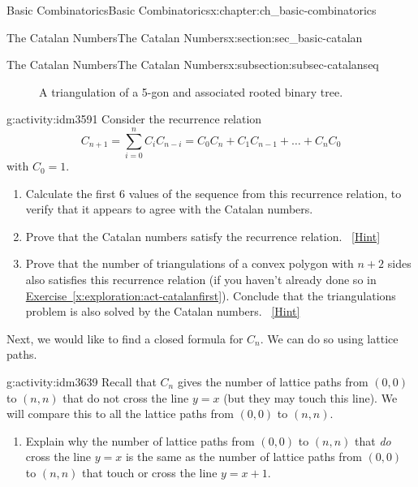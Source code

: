 \documentclass[oneside,10pt,]{book}
\numberwithin{equation}{chapter}
\newcommand{\vtx}[2]{node[fill,circle,inner sep=0pt, minimum size=4pt,label=#1:#2]{}}
\newcommand{\va}[1]{\vtx{above}{#1}}
\renewcommand{\v}{\vtx{above}{}}
\begin{document}
\begin{chapterptx}{Basic Combinatorics}{}{Basic Combinatorics}{}{}{x:chapter:ch_basic-combinatorics}
\begin{sectionptx}{The Catalan Numbers}{}{The Catalan Numbers}{}{}{x:section:sec_basic-catalan}
\begin{subsectionptx}{The Catalan Numbers}{}{The Catalan Numbers}{}{}{x:subsection:subsec-catalanseq}
\begin{figure}
\begin{sidebyside}{2}{0.125}{0.125}{0.25}
\begin{sbspanel}{0.25}
        \end{sbspanel}%
\end{sidebyside}%
\caption{A triangulation of a 5-gon and associated rooted binary tree.\label{x:figure:fig-triangulationtree}}
\end{figure}
\begin{activity}{}{g:activity:idm3591}%
Consider the recurrence relation%
\begin{equation*}
C_{n + 1} = \sum_{i = 0}^n C_iC_{n-i} = C_{0}C_{n} + C_{1}C_{n - 1} + \ldots + C_{n}C_{0}
\end{equation*}
with \(C_0 = 1\).%
\begin{enumerate}[font=\bfseries,label=(\alph*),ref=\alph*]
\item{}Calculate the first 6 values of the sequence from this recurrence relation, to verify that it appears to agree with the Catalan numbers.%
\item{}Prove that the Catalan numbers satisfy the recurrence relation.%
\qquad~\hfill{\tiny\hyperlink{g:hint:idm3604-back}{[Hint]}}\item{}Prove that the number of triangulations of a convex polygon with \(n+2\) sides also satisfies this recurrence relation (if you haven't already done so in \hyperref[x:exploration:act-catalanfirst]{Exercise~\ref{x:exploration:act-catalanfirst}}).  Conclude that the triangulations problem is also solved by the Catalan numbers.%
\qquad~\hfill{\tiny\hyperlink{g:hint:idm3629-back}{[Hint]}}\end{enumerate}
\end{activity}
Next, we would like to find a closed formula for \(C_n\).  We can do so using lattice paths.%
\begin{activity}{}{g:activity:idm3639}%
Recall that \(C_n\) gives the number of lattice paths from \((0,0)\) to \((n,n)\) that do not cross the line \(y = x\) (but they may touch this line).  We will compare this to all the lattice paths from \((0,0)\) to \((n,n)\).%
\begin{enumerate}[font=\bfseries,label=(\alph*),ref=\alph*]
\item{}Explain why the number of lattice paths from \((0,0)\) to \((n,n)\) that \emph{do} cross the line \(y = x\) is the same as the number of lattice paths from \((0,0)\) to \((n,n)\) that touch or cross the line \(y = x + 1\).%

\end{enumerate}
\end{activity}
\end{subsectionptx}
\end{sectionptx}
\end{chapterptx}
\end{document}
